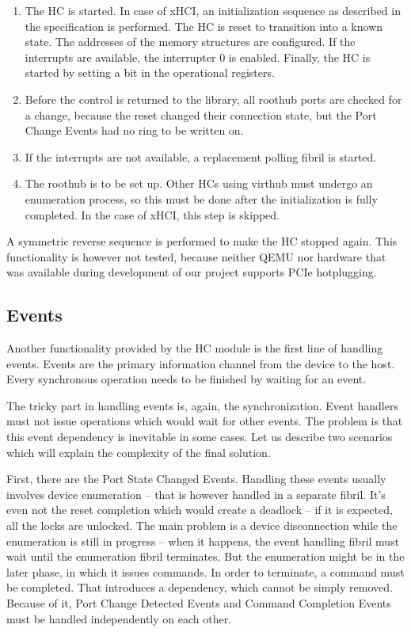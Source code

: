 \begin{enumerate}
\item
	The HC is started. In case of xHCI, an initialization sequence as described
	in the specification is performed. The HC is reset to transition into
	a known state. The addresses of the memory structures are configured. If
	the interrupts are available, the interrupter 0 is enabled. Finally, the HC
	is started by setting a bit in the operational registers.

\item
	Before the control is returned to the library, all roothub ports are
	checked for a change, because the reset changed their connection state,
	but the Port Change Events had no ring to be written on.

\item
	If the interrupts are not available, a replacement polling fibril is
	started.

\item
	The roothub is to be set up. Other HCs using virthub must undergo an
	enumeration process, so this must be done after the initialization is fully
	completed. In the case of xHCI, this step is skipped.
\end{enumerate}

A symmetric reverse sequence is performed to make the HC stopped again. This
functionality is however not tested, because neither QEMU nor hardware that was
available during development of our project supports PCIe hotplugging.

\subsection{Events}
\label{sec:events}

Another functionality provided by the HC module is the first line of handling
events. Events are the primary information channel from the device to the host.
Every synchronous operation needs to be finished by waiting for an event.

The tricky part in handling events is, again, the synchronization. Event
handlers must not issue operations which would wait for other events. The
problem is that this event dependency is inevitable in some cases. Let us
describe two scenarios which will explain the complexity of the final solution.

First, there are the Port State Changed Events. Handling these events usually
involves device enumeration -- that is however handled in a separate fibril.
It's even not the reset completion which would create a deadlock -- if it is
expected, all the locks are unlocked. The main problem is a device
disconnection while the enumeration is still in progress -- when it happens,
the event handling fibril must wait until the enumeration fibril terminates.
But the enumeration might be in the later phase, in which it issues commands.
In order to terminate, a command must be completed. That introduces
a dependency, which cannot be simply removed. Because of it, Port Change
Detected Events and Command Completion Events must be handled independently on
each other.

